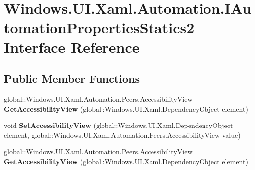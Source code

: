 \hypertarget{interface_windows_1_1_u_i_1_1_xaml_1_1_automation_1_1_i_automation_properties_statics2}{}\section{Windows.\+U\+I.\+Xaml.\+Automation.\+I\+Automation\+Properties\+Statics2 Interface Reference}
\label{interface_windows_1_1_u_i_1_1_xaml_1_1_automation_1_1_i_automation_properties_statics2}
\subsection*{Public Member Functions}
\begin{DoxyCompactItemize}
\item 
\mbox{\label{interface_windows_1_1_u_i_1_1_xaml_1_1_automation_1_1_i_automation_properties_statics2_aab43521abb89217c9ceabc47e5d7cb7a}} 
global\+::\+Windows.\+U\+I.\+Xaml.\+Automation.\+Peers.\+Accessibility\+View {\bfseries Get\+Accessibility\+View} (global\+::\+Windows.\+U\+I.\+Xaml.\+Dependency\+Object element)
\item 
\mbox{\label{interface_windows_1_1_u_i_1_1_xaml_1_1_automation_1_1_i_automation_properties_statics2_af8ed4cb19e3b8a43bc68b0ba0231c3ae}} 
void {\bfseries Set\+Accessibility\+View} (global\+::\+Windows.\+U\+I.\+Xaml.\+Dependency\+Object element, global\+::\+Windows.\+U\+I.\+Xaml.\+Automation.\+Peers.\+Accessibility\+View value)
\item 
\mbox{\label{interface_windows_1_1_u_i_1_1_xaml_1_1_automation_1_1_i_automation_properties_statics2_aab43521abb89217c9ceabc47e5d7cb7a}} 
global\+::\+Windows.\+U\+I.\+Xaml.\+Automation.\+Peers.\+Accessibility\+View {\bfseries Get\+Accessibility\+View} (global\+::\+Windows.\+U\+I.\+Xaml.\+Dependency\+Object element)
\item 
\mbox{\label{interface_windows_1_1_u_i_1_1_xaml_1_1_automation_1_1_i_automation_properties_statics2_af8ed4cb19e3b8a43bc68b0ba0231c3ae}} 

\end{DoxyCompactItemize}
